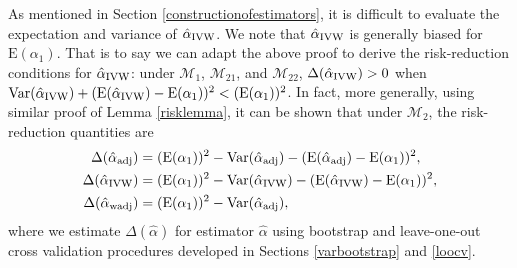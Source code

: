 \documentclass[11pt]{article}
\def\mrm#1{\mathrm{#1}} %
\def\mc#1{\mathcal{#1}} %
\def\E#1{\mathrm{E}(#1)} %
\def\var#1{\mathrm{Var}(#1)} %
\theoremstyle{definition}
\begin{document}
 


As mentioned in Section \ref{constructionofestimators}, it is difficult to evaluate the expectation and variance of $\hat{\alpha}_{\rm IVW}$. We note that $\hat{\alpha}_{\rm IVW}$ is generally biased for $\E{\alpha_1}$. That is to say we can adapt the above proof to derive the risk-reduction conditions for $\hat{\alpha}_{\rm IVW}$: under $\mc{M}_{1}$, $\mc{M}_{21}$, and $\mc{M}_{22}$, $\Delta(\hat\alpha_{\rm IVW}) > 0$ when $\var{\hat{\alpha}_{\rm IVW}} +(\E{\hat{\alpha}_{\rm IVW}}-\E{\alpha_1})^2<(\E{\alpha_1})^2$.  In fact, more generally, using similar proof of Lemma \ref{risklemma}, it can be shown that under $\mc{M}_2$, the risk-reduction quantities are
\begin{align*}
  \Delta(\hat{\alpha}_{\rm adj}) 
  &= (\E{\alpha_1})^2 -\var{\hat{\alpha}_{\rm adj}}-(\E{\hat{\alpha}_{\rm adj}}-\E{\alpha_1})^2,\\
  \Delta(\hat{\alpha}_{\rm IVW}) 
  &= (\E{\alpha_1})^2 -\var{\hat{\alpha}_{\rm IVW}}-(\E{\hat{\alpha}_{\rm IVW}}-\E{\alpha_1})^2 ,\\
  \Delta(\hat{\alpha}_{\rm wadj}) 
  &= (\E{\alpha_1})^2 -\var{\hat{\alpha}_{\rm adj}},
\end{align*}
where we estimate $\Delta(\hat{\alpha})$ for estimator $\hat\alpha$  using bootstrap and leave-one-out cross validation procedures developed in Sections \ref{varbootstrap} and \ref{loocv}. 
 

\end{document}
